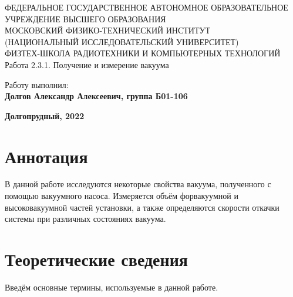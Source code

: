 \documentclass[15pt,a5paper,reqno]{article}
\begin{document}
\begin{center}
  {\small ФЕДЕРАЛЬНОЕ ГОСУДАРСТВЕННОЕ АВТОНОМНОЕ ОБРАЗОВАТЕЛЬНОЕ\\ УЧРЕЖДЕНИЕ ВЫСШЕГО ОБРАЗОВАНИЯ\\ МОСКОВСКИЙ ФИЗИКО-ТЕХНИЧЕСКИЙ ИНСТИТУТ\\ (НАЦИОНАЛЬНЫЙ ИССЛЕДОВАТЕЛЬСКИЙ УНИВЕРСИТЕТ)\\ ФИЗТЕХ-ШКОЛА РАДИОТЕХНИКИ И КОМПЬЮТЕРНЫХ ТЕХНОЛОГИЙ}\\
  \hfill \break
  \hfill \break
  \hfill \break
  \Huge{Работа 2.3.1. Получение и измерение вакуума}\\
\end{center}

\hfill \break
\hfill \break
\hfill \break
\hfill \break
\hfill \break
\hfill \break

\begin{flushright}
  \normalsize{Работу выполнил:}\\
  \normalsize{\textbf{Долгов Александр Алексеевич, группа Б01-106}}\\
\end{flushright}

\hfill \break
\hfill \break
\hfill \break

\begin{center}
  \normalsize{\textbf{Долгопрудный, 2022}}
\end{center}


\thispagestyle{empty} %


\newpage
\thispagestyle{plain}
\tableofcontents
\thispagestyle{plain}
\newpage

\section{Аннотация}

	В данной работе исследуются некоторые свойства вакуума, полученного с помощью вакуумного насоса. Измеряется объём форвакуумной и высоковакуумной частей установки, а также определяются скорости откачки системы при различных состояниях вакуума.

\section{Теоретические сведения}

    Введём основные термины, используемые в данной работе.
    
\end{document}
